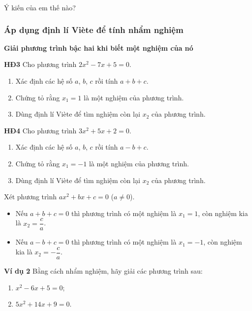 \begin{lesson}
    Ý kiến của em thế nào?

    \answerline

    \subsubsection{Áp dụng định lí Viète để tính nhẩm nghiệm}

    \textbf{Giải phương trình bậc hai khi biết một nghiệm của nó}

    \textbf{HĐ3} Cho phương trình $2x^2-7x+5=0$.
    \begin{enumerate}[label=\alph*)]
        \item Xác định các hệ số $a$, $b$, $c$ rồi tính $a+b+c$.
        \item Chứng tỏ rằng $x_1=1$ là một nghiệm của phương trình.
        \item Dùng định lí Viète để tìm nghiệm còn lại $x_2$ của phương trình.
    \end{enumerate}

    \answerline
    \answerline
    \answerline

    \textbf{HĐ4} Cho phương trình $3x^2+5x+2=0$.
    \begin{enumerate}[label=\alph*)]
        \item Xác định các hệ số $a$, $b$, $c$ rồi tính $a-b+c$.
        \item Chứng tỏ rằng $x_1=-1$ là một nghiệm của phương trình.
        \item Dùng định lí Viète để tìm nghiệm còn lại $x_2$ của phương trình.
    \end{enumerate}

    \answerline
    \answerline
    \answerline

    \begin{keyconcept}
        Xét phương trình $ax^2+bx+c=0$ ($a\ne0$).
        \begin{itemize}
            \item Nếu $a+b+c=0$ thì phương trình có một nghiệm là $x_1=1$, còn nghiệm kia là $x_2=\dfrac{c}{a}$.
            \item Nếu $a-b+c=0$ thì phương trình có một nghiệm là $x_1=-1$, còn nghiệm kia là $x_2=-\dfrac{c}{a}$.
        \end{itemize}
    \end{keyconcept}

    \textbf{Ví dụ 2} Bằng cách nhẩm nghiệm, hãy giải các phương trình sau:
    \begin{enumerate}[label=\alph*)]
        \item $x^2-6x+5=0$;
        \item $5x^2+14x+9=0$.
    \end{enumerate}


\end{lesson}
